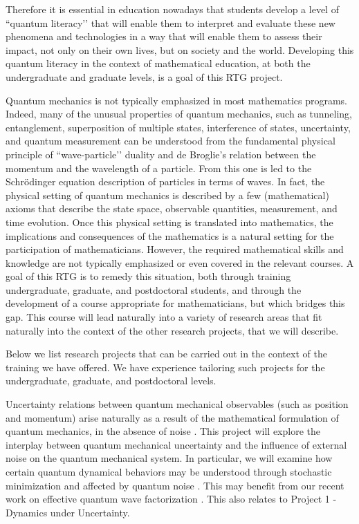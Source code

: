 \documentclass[11pt]{NSFamsart}
\begin{document}
Therefore it is essential in education nowadays that students develop a level of ``quantum literacy’’ \cite{foti2021quantum} that will enable them to interpret and evaluate these new phenomena and technologies in a way that will enable them to assess their impact, not only on their own  lives, but on society and the world. Developing this quantum literacy in the context of mathematical education,    at both the undergraduate and graduate   levels,  is a goal of this RTG project.


Quantum mechanics is not typically emphasized in most mathematics programs.  Indeed, many of the unusual properties of quantum mechanics, such as tunneling, entanglement, superposition of multiple states, interference of states, uncertainty, and quantum measurement can be understood from the fundamental physical principle of ``wave-particle’’ duality and de Broglie’s relation between the momentum and the wavelength of a particle.  From this one is led to the Schr\"{o}dinger equation description of particles in terms of waves. In fact, the physical setting of quantum mechanics is described by a few (mathematical) axioms that describe the state space, observable quantities, measurement, and time evolution.  Once this physical setting is translated into mathematics, the implications and consequences of the mathematics is a natural setting for the participation of mathematicians. However, the required mathematical skills and knowledge are not typically emphasized or even covered in the relevant courses. A goal of this RTG is to remedy this situation, both through training undergraduate, graduate, and postdoctoral students, and through the development of a course appropriate for mathematicians, but which bridges this gap. This course will lead naturally into a variety of research areas that fit naturally into the context of the other research projects, that we will describe.


\medskip
\noindent
 Below we list   research projects that can be  carried out in the context of the training we have offered.  We have experience tailoring such projects for the undergraduate, graduate, and postdoctoral levels.
 

\smallskip
{} Uncertainty relations between quantum mechanical observables (such as position and momentum) arise naturally as a result of the mathematical formulation of quantum mechanics, in the absence of noise \cite{Griffiths2018IntroductionTQ}. This project will explore the interplay between quantum mechanical uncertainty and the influence of external noise \cite{Lindgren2019QuantumMC, Nagasawa2000StochasticPI} on the quantum mechanical system. In particular, we will examine how certain quantum dynamical behaviors  may be understood through stochastic minimization \cite{Lindgren2019QuantumMC} and affected by quantum noise \cite{Nurdin2019QuantumSP}. This may   benefit from our recent work on effective quantum wave factorization \cite{ZHANG2020132573}. This also relates to   Project 1 - Dynamics under Uncertainty.
\end{document}
